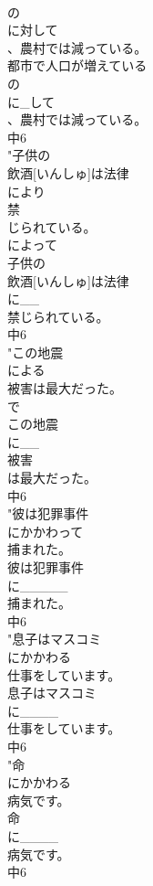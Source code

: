 \documentclass[8pt]{extreport}
\begin{document}
\begin{CJK}{UTF8}{min}
\\	の
\\	に対して
\\	、農村では減っている。
\\	都市で人口が増えている
\\	の
\\	に_して
\\	、農村では減っている。
\\	中6
\\	"子供の
\\	飲酒[いんしゅ]は法律
\\	により
\\	禁
\\	じられている。
\\	によって
\\	子供の
\\	飲酒[いんしゅ]は法律
\\	に__
\\	禁じられている。
\\	中6
\\	"この地震
\\	による
\\	被害は最大だった。
\\	で
\\	この地震
\\	に__
\\	被害
\\	は最大だった。
\\	中6
\\	"彼は犯罪事件
\\	にかかわって
\\	捕まれた。
\\	彼は犯罪事件
\\	に_____
\\	捕まれた。
\\	中6
\\	"息子はマスコミ
\\	にかかわる
\\	仕事をしています。
\\	息子はマスコミ
\\	に____
\\	仕事をしています。
\\	中6
\\	"命
\\	にかかわる
\\	病気です。
\\	命
\\	に____
\\	病気です。
\\	中6

\end{CJK}
\end{document}
